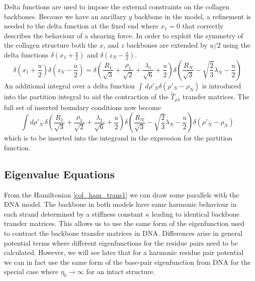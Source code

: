 Delta functions are used to impose the external constraints on the collagen backbones. Because we have an ancillary $y$ backbone in the model, a refinement is needed to the delta function at the fixed end where $x_{1}=0$ that correctly describes the behaviour of a shearing force. In order to exploit the symmetry of the collagen structure both the $x$, and $z$ backbones are extended by $u/2$ using the delta functions $\delta\left(x_1+\frac{u}{2}\right)$ and $\delta\left(z_N-\frac{u}{2}\right)$. 
%
\begin{equation}\label{col_hyp_bound_cond}
\delta\left(x_1+\frac{u}{2}\right)\delta\left(z_N-\frac{u}{2}\right) = \delta\left(\frac{R_1}{\sqrt{3}} + \frac{\rho_1}{\sqrt{2}} + \frac{\lambda_1}{\sqrt{6}}+\frac{u}{2}\right)\delta\left(\frac{R_N}{\sqrt{3}} - \sqrt{\frac{2}{3}}\lambda_N-\frac{u}{2}\right) 
\end{equation}
%
An additional integral over a delta function  $\int\,d\rho'_N \delta\left(\rho'_N-\rho_N\right)$ is introduced into the partition integral to aid the contraction of the $\hat{T}_{\rho\lambda}$ transfer matrices. The full set of inserted boundary conditions now become
%
\begin{equation}\label{col_hyp_full_boundcond}
\int d\rho'_N\, \delta\left(\frac{R_1}{\sqrt{3}} + \frac{\rho_1}{\sqrt{2}} + \frac{\lambda_1}{\sqrt{6}}+\frac{u}{2}\right)\delta\left(\frac{R_N}{\sqrt{3}} - \sqrt{\frac{2}{3}}\lambda_N-\frac{u}{2}\right)  \delta\left(\rho'_N-\rho_N\right)
\end{equation}
%
which is to be inserted into the integrand in the expression for the partition function.
%
\subsection{Eigenvalue Equations}

From the Hamiltonian \eqref{col_ham_trans1} we can draw some parallels with the DNA model. The backbone in both models have same harmonic behaviour in each strand determined by a stiffness constant $\kappa$  leading to identical backbone transfer matrices. This allows us to use the same form of the eigenfunction used to contract the backbone transfer matrices in DNA. Differences arise in general potential terms where different eigenfunctions for the residue pairs need to be calculated. However, we will see later that for a harmonic residue pair potential we can in fact use the same form of the base-pair eigenfunction from DNA for the special case where $\eta_b \rightarrow \infty$ for an intact structure.

